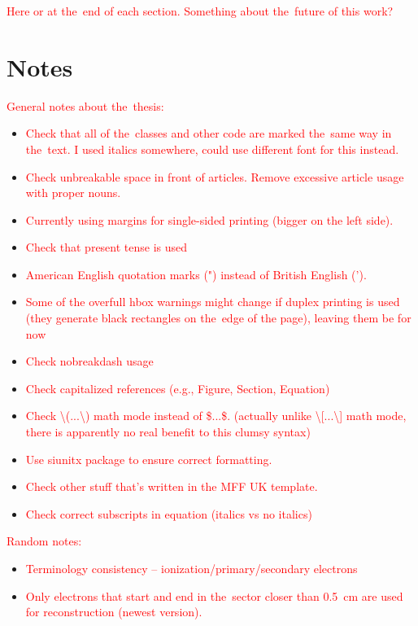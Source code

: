 	\textcolor{red}{Here or at the~end of each section. Something about the~future of this work?}
	
	\section*{Notes}
		\textcolor{red}{General notes about the~thesis:}
		\begin{itemize}[topsep=4pt,itemsep=2pt]
			\item \textcolor{red}{Check that all of the~classes and other code are marked the~same way in the~text. I used italics somewhere, could use different font for this instead.}
			\item \textcolor{red}{Check unbreakable space in front of articles. Remove excessive article usage with proper nouns.}
			\item \textcolor{red}{Currently using margins for single-sided printing (bigger on the left side).}
			\item \textcolor{red}{Check that present tense is used}
			\item \textcolor{red}{American English quotation marks (") instead of British English (').}
			\item \textcolor{red}{Some of the overfull hbox warnings might change if duplex printing is used (they generate black rectangles on the~edge of the page), leaving them be for now}
			\item \textcolor{red}{Check nobreakdash usage}
			\item \textcolor{red}{Check capitalized references (e.g., Figure, Section, Equation)}
			\item \textcolor{red}{Check \textbackslash(...\textbackslash) math mode instead of \$...\$. (actually unlike \textbackslash[...\textbackslash] math mode, there is apparently no real benefit to this clumsy syntax)}
			\item \textcolor{red}{Use siunitx package to ensure correct formatting.}
			\item \textcolor{red}{Check other stuff that's written in the MFF UK template.}
			\item \textcolor{red}{Check correct subscripts in equation (italics vs no italics)}\\
		\end{itemize}
		\textcolor{red}{Random notes:}
		\begin{itemize}[topsep=4pt,itemsep=2pt]
			\item \textcolor{red}{Terminology consistency -- ionization/primary/secondary electrons}
			\item \textcolor{red}{Only electrons that start and end in the~sector closer than 0.5~cm are used for reconstruction (newest version).}
		\end{itemize}
		
